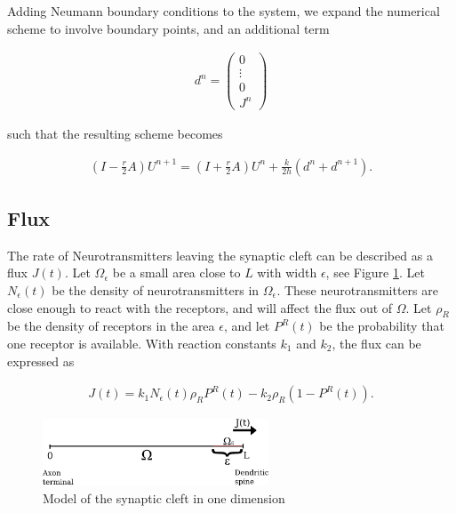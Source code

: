 Adding Neumann boundary conditions to the system, we expand the numerical scheme to involve boundary points, and an additional term

\begin{align*}
d^n = 
\begin{pmatrix}
0 \\
\vdots \\
0 \\
J^n
\end{pmatrix}
\end{align*}

such that the resulting scheme becomes

\begin{align*}
\left(I - \frac{r}{2} A\right)U^{n+1} = \left(I + \frac{r}{2} A\right) U^n + \frac{k}{2h}(d^n + d^{n+1}).
\end{align*}


\subsection*{Flux}

The rate of Neurotransmitters leaving the synaptic cleft can be described as a flux $J(t)$. Let $\Omega_{\epsilon}$ be a small area close to $L$ with width $\epsilon$, see Figure \ref{fig:model_1d}. Let $N_{\epsilon}(t)$ be the density of neurotransmitters in $\Omega_{\epsilon}$. These neurotransmitters are close enough to react with the receptors, and will affect the flux out of $\Omega$. Let $\rho_R$ be the density of receptors in the area $\epsilon$, and let $P^R(t)$ be the probability that one receptor is available. With reaction constants $k_1$ and $k_2$, the flux can be expressed as

\begin{align*}
J(t) = k_1 N_{\epsilon}(t) \rho_R P^R(t) - k_2 \rho_R (1-P^R(t)).
\end{align*}


\begin{figure}[ht]
        \centering
        \includegraphics[clip=true,width=0.6\textwidth]{model_1d}
        \caption{Model of the synaptic cleft in one dimension}
        \label{fig:model_1d}
\end{figure}


